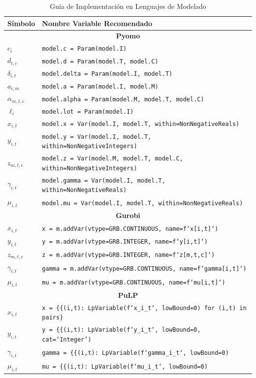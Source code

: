 \begin{table}[h]
\centering
\caption{Guía de Implementación en Lenguajes de Modelado}
\label{tab:implementation-guide}

\begin{tabular}{|l|l|}
\hline
\textbf{Símbolo} & \textbf{Nombre Variable Recomendado} \\
\hline
\multicolumn{2}{|c|}{\textbf{Pyomo}} \\
\hline
$c_i$ & \texttt{model.c = Param(model.I)} \\
$d_{t,c}$ & \texttt{model.d = Param(model.T, model.C)} \\
$\delta_{i,t}$ & \texttt{model.delta = Param(model.I, model.T)} \\
$a_{i,m}$ & \texttt{model.a = Param(model.I, model.M)} \\
$\alpha_{m,t,c}$ & \texttt{model.alpha = Param(model.M, model.T, model.C)} \\
$\ell_i$ & \texttt{model.lot = Param(model.I)} \\
$x_{i,t}$ & \texttt{model.x = Var(model.I, model.T, within=NonNegativeReals)} \\
$y_{i,t}$ & \texttt{model.y = Var(model.I, model.T, within=NonNegativeIntegers)} \\
$z_{m,t,c}$ & \texttt{model.z = Var(model.M, model.T, model.C, within=NonNegativeIntegers)} \\
$\gamma_{i,t}$ & \texttt{model.gamma = Var(model.I, model.T, within=NonNegativeReals)} \\
$\mu_{i,t}$ & \texttt{model.mu = Var(model.I, model.T, within=NonNegativeReals)} \\
\hline
\multicolumn{2}{|c|}{\textbf{Gurobi}} \\
\hline
$x_{i,t}$ & \texttt{x = m.addVar(vtype=GRB.CONTINUOUS, name=f`x[{i},{t}]`)} \\
$y_{i,t}$ & \texttt{y = m.addVar(vtype=GRB.INTEGER, name=f`y[{i},{t}]`)} \\
$z_{m,t,c}$ & \texttt{z = m.addVar(vtype=GRB.INTEGER, name=f`z[{m},{t},{c}]`)} \\
$\gamma_{i,t}$ & \texttt{gamma = m.addVar(vtype=GRB.CONTINUOUS, name=f`gamma[{i},{t}]`)} \\
$\mu_{i,t}$ & \texttt{mu = m.addVar(vtype=GRB.CONTINUOUS, name=f`mu[{i},{t}]`)} \\
\hline
\multicolumn{2}{|c|}{\textbf{PuLP}} \\
\hline
$x_{i,t}$ & \texttt{x = \{\{(i,t): LpVariable(f`x_{i}_{t}`, lowBound=0) for (i,t) in pairs\}} \\
$y_{i,t}$ & \texttt{y = \{\{(i,t): LpVariable(f`y_{i}_{t}`, lowBound=0, cat=`Integer')} \\
$\gamma_{i,t}$ & \texttt{gamma = \{\{(i,t): LpVariable(f`gamma_{i}_{t}`, lowBound=0)} \\
$\mu_{i,t}$ & \texttt{mu = \{\{(i,t): LpVariable(f`mu_{i}_{t}`, lowBound=0)} \\
\hline
\end{tabular}
\end{table}
